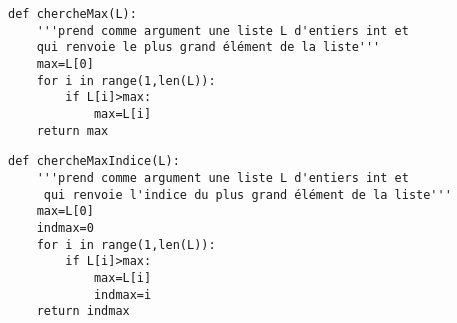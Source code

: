 \exer{}
\setcounter{numques}{0}


\begin{lstlisting}
def chercheMax(L):
    '''prend comme argument une liste L d'entiers int et 
    qui renvoie le plus grand élément de la liste'''
    max=L[0]
    for i in range(1,len(L)):
        if L[i]>max:
            max=L[i]
    return max
\end{lstlisting}



\begin{lstlisting}
def chercheMaxIndice(L):
    '''prend comme argument une liste L d'entiers int et
     qui renvoie l'indice du plus grand élément de la liste'''
    max=L[0]
    indmax=0
    for i in range(1,len(L)):
        if L[i]>max:
            max=L[i]
            indmax=i
    return indmax
\end{lstlisting}
